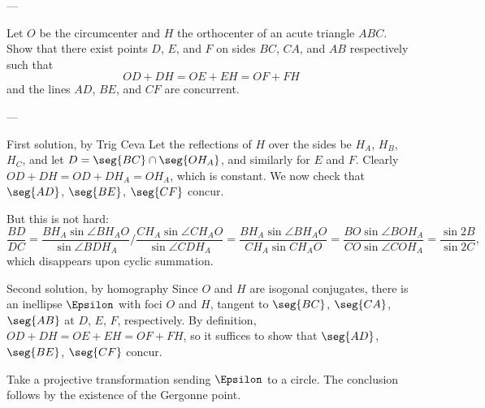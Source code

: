 
---

Let $O$ be the circumcenter and $H$ the orthocenter of an acute triangle $ABC$. Show that there exist points $D$, $E$, and $F$ on sides $BC$, $CA$, and $AB$ respectively such that\[OD+DH=OE+EH=OF+FH\]
and the lines $AD$, $BE$, and $CF$ are concurrent.

---

\begin{customenv}{First solution, by Trig Ceva}
    Let the reflections of $H$ over the sides be $H_A$, $H_B$, $H_C$, and let $D=\seg{BC}\cap\seg{OH_A}$, and similarly for $E$ and $F$. Clearly $OD+DH=OD+DH_A=OH_A$, which is constant. We now check that $\seg{AD}$, $\seg{BE}$, $\seg{CF}$ concur.

    But this is not hard: \[\frac{BD}{DC}=\frac{BH_A\sin\angle BH_AO}{\sin\angle BDH_A}\bigg/\frac{CH_A\sin\angle CH_AO}{\sin\angle CDH_A}=\frac{BH_A\sin\angle BH_AO}{CH_A\sin CH_AO}=\frac{BO\sin\angle BOH_A}{CO\sin\angle COH_A}=\frac{\sin 2B}{\sin 2C},\]
    which disappears upon cyclic summation.
\end{customenv}
\begin{customenv}{Second solution, by homography}
    Since $O$ and $H$ are isogonal conjugates, there is an inellipse $\Epsilon$ with foci $O$ and $H$, tangent to $\seg{BC}$, $\seg{CA}$, $\seg{AB}$ at $D$, $E$, $F$, respectively. By definition, $OD+DH=OE+EH=OF+FH$, so it suffices to show that $\seg{AD}$, $\seg{BE}$, $\seg{CF}$ concur.

    Take a projective transformation sending $\Epsilon$ to a circle. The conclusion follows by the existence of the Gergonne point.
\end{customenv}

